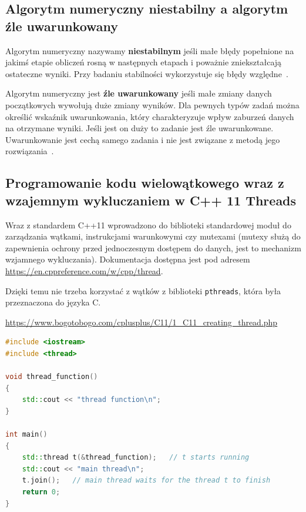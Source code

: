 \documentclass[wi]{zut}
\begin{document}
\subsection{Algorytm numeryczny niestabilny a algorytm źle uwarunkowany}

Algorytm numeryczny nazywamy \textbf{niestabilnym} jeśli małe błędy popełnione na jakimś etapie obliczeń rosną w następnych etapach i poważnie zniekształcają ostateczne wyniki. Przy badaniu stabilności wykorzystuje się błędy względne~\cite{Piela_Wstep}.

Algorytm numeryczny jest \textbf{źle uwarunkowany} jeśli małe zmiany danych początkowych wywołują duże zmiany wyników. Dla pewnych typów zadań można określić wskaźnik uwarunkowania, który charakteryzuje wpływ zaburzeń danych na otrzymane wyniki. Jeśli jest on duży to zadanie jest źle uwarunkowane. Uwarunkowanie jest cechą samego zadania i nie jest związane z metodą jego rozwiązania~\cite{Piela_Wstep}.

\subsection{Programowanie kodu wielowątkowego wraz z wzajemnym wykluczaniem w C++ 11 Threads}

Wraz z standardem C++11 wprowadzono do biblioteki standardowej moduł do zarządzania wątkami, instrukcjami warunkowymi czy mutexami (mutexy służą do zapewnienia ochrony przed jednoczesnym dostępem do danych, jest to mechanizm wzjamnego wykluczania). Dokumentacja dostępna jest pod adresem \url{https://en.cppreference.com/w/cpp/thread}.

Dzięki temu nie trzeba korzystać z wątków z biblioteki \lstinline{pthreads}, która była przeznaczona do języka C.

{\url{https://www.bogotobogo.com/cplusplus/C11/1_C11_creating_thread.php}}{\label{kod:przyklad}}
\begin{lstlisting}[language=C++]
#include <iostream>
#include <thread>

void thread_function()
{
    std::cout << "thread function\n";
}

int main()
{
    std::thread t(&thread_function);   // t starts running
    std::cout << "main thread\n";
    t.join();   // main thread waits for the thread t to finish
    return 0;
}
\end{lstlisting}
\end{document}
